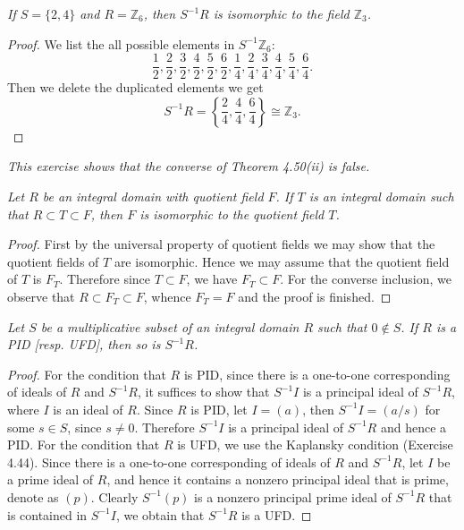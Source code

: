 \begin{problem}\em
If $S=\{2,4\}$ and $R=\mathbb{Z}_6$, then $S^{-1}R$ is isomorphic to the field $\mathbb{Z}_3$.
\end{problem}
\begin{proof}
We list the all possible elements in $S^{-1}\mathbb{Z}_6$: 
$$
\frac{1}{2},\frac{2}{2},\frac{3}{2},\frac{4}{2},\frac{5}{2},\frac{6}{2},\frac{1}{4},\frac{2}{4},\frac{3}{4},\frac{4}{4},\frac{5}{4},\frac{6}{4}.
$$
Then we delete the duplicated elements we get 
$$
S^{-1}R=\left\{ \frac{2}{4},\frac{4}{4},\frac{6}{4} \right\} \cong \mathbb{Z} _3.
$$
\end{proof}
\begin{note}\em
This exercise shows that the converse of Theorem 4.50(ii) is false.
\end{note}
\begin{problem}\em
Let $R$ be an integral domain with quotient field $F$. If $T$ is an integral domain such that $R\subset T\subset F$, then $F$ is isomorphic to the quotient field $T$.
\end{problem}
\begin{proof}
First by the universal property of quotient fields we may show that the quotient fields of $T$ are isomorphic. Hence we may assume that the quotient field of $T$ is $F_T$. Therefore since $T\subset F$, we have $F_T\subset F$. For the converse inclusion, we observe that $R\subset F_T\subset F$, whence $F_T=F$ and the proof is finished.
\end{proof}
\begin{problem}\em
Let $S$ be a multiplicative subset of an integral domain $R$ such that $0\notin S$. If $R$ is a PID [resp. UFD], then so is $S^{-1}R$.
\end{problem}
\begin{proof}
For the condition that $R$ is PID, since there is a one-to-one corresponding of ideals of $R$ and $S^{-1}R$, it suffices to show that $S^{-1}I$ is a principal ideal of $S^{-1}R$, where $I$ is an ideal of $R$. Since $R$ is PID, let $I=(a)$, then $S^{-1}I=(a/s)$ for some $s\in S$, since $s\ne 0$. Therefore $S^{-1}I$ is a principal ideal of $S^{-1}R$ and hence a PID. For the condition that $R$ is UFD, we use the Kaplansky condition (Exercise 4.44). Since there is a one-to-one corresponding of ideals of $R$ and $S^{-1}R$, let $I$ be a prime ideal of $R$, and hence it contains a nonzero principal ideal that is prime, denote as $(p)$. Clearly $S^{-1}(p)$ is a nonzero principal prime ideal of $S^{-1}R$ that is contained in $S^{-1}I$, we obtain that $S^{-1}R$ is a UFD.
\end{proof}
